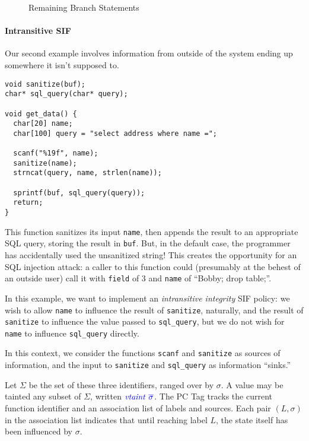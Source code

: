 \documentclass{llncs}
\begin{document}
\begin{figure}
\begin{subfigure}{0.3\textwidth}
  \end{subfigure}
  
  \caption{Remaining Branch Statements}
  \label{fig:rest}
\end{figure}

\paragraph*{Intransitive SIF}

Our second example involves information from outside of the system ending up somewhere it isn't supposed to.

\begin{verbatim}
void sanitize(buf);
char* sql_query(char* query);

void get_data() {
  char[20] name;
  char[100] query = "select address where name =";

  scanf("%19f", name);
  sanitize(name);
  strncat(query, name, strlen(name));
  
  sprintf(buf, sql_query(query));
  return;
}
\end{verbatim}

This function sanitizes its input {\tt name}, then appends the result to an appropriate SQL
query, storing the result in {\tt buf}. But, in the default case, the programmer has accidentally
used the unsanitized string! This creates the opportunity for an SQL injection attack: a caller
to this function could (presumably at the behest of an outside user) call it with {\tt field} of
3 and {\tt name} of ``Bobby; drop table;''.

In this example, we want to implement an {\it intransitive integrity} SIF policy:
we wish to allow {\tt name} to influence the result of {\tt sanitize}, naturally, and the result
of {\tt sanitize} to influence the value passed to {\tt sql\_query}, but we do not wish for
{\tt name} to influence {\tt sql\_query} directly.

In this context, we consider the functions {\tt scanf} and {\tt sanitize} as sources of
information, and the input to {\tt sanitize} and {\tt sql\_query} as information ``sinks.''

Let \(\Sigma\) be the set of these three identifiers, ranged over by \(\sigma\). A value may be tainted
any subset of \(\Sigma\),
written \(\mathit{\color{blue} vtaint ~ \overline{\sigma}}\). The PC Tag tracks the current function identifier and an
association list of labels and sources. Each pair \((L, \sigma)\) in the association list indicates
that until reaching label \(L\), the state itself has been influenced by \(\sigma\).
\end{document}
